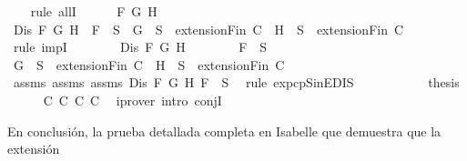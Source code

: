\begin{isabellebody}
\ \ \isamarkupfalse%
\ {\isacharparenleft}rule\ allI{\isacharparenright}{\isacharplus}\isanewline
\ \ \ \ \isamarkupfalse%
\ F\ G\ H\isanewline
\ \ \ \ \isamarkupfalse%
\ {\isachardoublequoteopen}Dis\ F\ G\ H\ {\isasymlongrightarrow}\ F\ {\isasymin}\ S\ {\isasymlongrightarrow}\ {\isacharbraceleft}G{\isacharbraceright}\ {\isasymunion}\ S\ {\isasymin}\ {\isacharparenleft}extensionFin\ C{\isacharparenright}\ {\isasymor}\ {\isacharbraceleft}H{\isacharbraceright}\ {\isasymunion}\ S\ {\isasymin}\ {\isacharparenleft}extensionFin\ C{\isacharparenright}{\isachardoublequoteclose}\isanewline
\ \ \ \ \isamarkupfalse%
\ {\isacharparenleft}rule\ impI{\isacharparenright}{\isacharplus}\isanewline
\ \ \ \ \ \ \isamarkupfalse%
\ {\isachardoublequoteopen}Dis\ F\ G\ H{\isachardoublequoteclose}\isanewline
\ \ \ \ \ \ \isamarkupfalse%
\ {\isachardoublequoteopen}F\ {\isasymin}\ S{\isachardoublequoteclose}\ \isanewline
\ \ \ \ \ \ \isamarkupfalse%
\ {\isachardoublequoteopen}{\isacharbraceleft}G{\isacharbraceright}\ {\isasymunion}\ S\ {\isasymin}\ {\isacharparenleft}extensionFin\ C{\isacharparenright}\ {\isasymor}\ {\isacharbraceleft}H{\isacharbraceright}\ {\isasymunion}\ S\ {\isasymin}\ {\isacharparenleft}extensionFin\ C{\isacharparenright}{\isachardoublequoteclose}\isanewline
\ \ \ \ \ \ \ \ \isamarkupfalse%
\ assms{\isacharparenleft}{}{\isacharparenright}\ assms{\isacharparenleft}{}{\isacharparenright}\ assms{\isacharparenleft}{}{\isacharparenright}\ {\isacartoucheopen}Dis\ F\ G\ H{\isacartoucheclose}\ {\isacartoucheopen}F\ {\isasymin}\ S{\isacartoucheclose}\ \isamarkupfalse%
\ {\isacharparenleft}rule\ ex{}{\isacharunderscore}pcp{\isacharunderscore}SinE{\isacharunderscore}DIS{\isacharparenright}\isanewline
\ \ \ \ \isamarkupfalse%
\isanewline
\ \ \isamarkupfalse%
\isanewline
\ \ \isamarkupfalse%
\ {\isacharquery}thesis\isanewline
\ \ \ \ \isamarkupfalse%
\ C{}\ C{}\ C{}\ C{}\ \isamarkupfalse%
\ {\isacharparenleft}iprover\ intro{\isacharcolon}\ conjI{\isacharparenright}\isanewline
{}\isamarkupfalse%
%
\endisatagproof
{\isafoldproof}%
%
\isadelimproof
%
\endisadelimproof
%
\begin{isamarkuptext}%
En conclusión, la prueba detallada completa en Isabelle que demuestra que la extensión  

\end{isamarkuptext}
\end{isabellebody}
